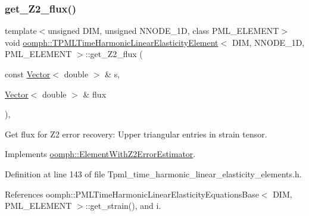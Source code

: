 \subsubsection{\texorpdfstring{get\+\_\+\+Z2\+\_\+flux()}{get\_Z2\_flux()}}
{\footnotesize\ttfamily template$<$unsigned D\+IM, unsigned N\+N\+O\+D\+E\+\_\+1D, class P\+M\+L\+\_\+\+E\+L\+E\+M\+E\+NT$>$ \\
void \hyperlink{classoomph_1_1TPMLTimeHarmonicLinearElasticityElement}{oomph\+::\+T\+P\+M\+L\+Time\+Harmonic\+Linear\+Elasticity\+Element}$<$ D\+IM, N\+N\+O\+D\+E\+\_\+1D, P\+M\+L\+\_\+\+E\+L\+E\+M\+E\+NT $>$\+::get\+\_\+\+Z2\+\_\+flux (\begin{DoxyParamCaption}\item[{const \hyperlink{classoomph_1_1Vector}{Vector}$<$ double $>$ \&}]{s,  }\item[{\hyperlink{classoomph_1_1Vector}{Vector}$<$ double $>$ \&}]{flux }\end{DoxyParamCaption})\hspace{0.3cm}{\ttfamily [inline]}, {\ttfamily [virtual]}}



Get \textquotesingle{}flux\textquotesingle{} for Z2 error recovery\+: Upper triangular entries in strain tensor. 



Implements \hyperlink{classoomph_1_1ElementWithZ2ErrorEstimator_a5688ff5f546d81771cabad82ca5a7556}{oomph\+::\+Element\+With\+Z2\+Error\+Estimator}.



Definition at line 143 of file Tpml\+\_\+time\+\_\+harmonic\+\_\+linear\+\_\+elasticity\+\_\+elements.\+h.



References oomph\+::\+P\+M\+L\+Time\+Harmonic\+Linear\+Elasticity\+Equations\+Base$<$ D\+I\+M, P\+M\+L\+\_\+\+E\+L\+E\+M\+E\+N\+T $>$\+::get\+\_\+strain(), and i.

\mbox{\label{classoomph_1_1TPMLTimeHarmonicLinearElasticityElement_ae7ac13cf22682d07ed3e3b7bce2ed05b}} 
